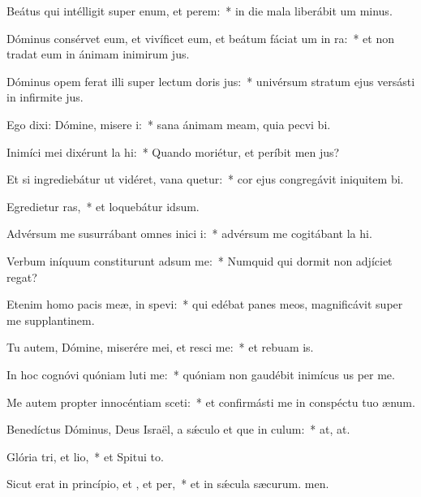 \item Beátus qui intélligit super enum, et perem:~* in die mala liberábit um minus.
\item Dóminus consérvet eum, et vivíficet eum, et beátum fáciat um in ra:~* et non tradat eum in ánimam inimirum jus.
\item Dóminus opem ferat illi super lectum doris jus:~* univérsum stratum ejus versásti in infirmite jus.
\item Ego dixi: Dómine, misere i:~* sana ánimam meam, quia pecvi bi.
\item Inimíci mei dixérunt la hi:~* Quando moriétur, et períbit men jus?
\item Et si ingrediebátur ut vidéret, vana quetur:~* cor ejus congregávit iniquitem bi.
\item Egredietur ras,~* et loquebátur  idsum.
\item Advérsum me susurrábant omnes inici i:~* advérsum me cogitábant la hi.
\item Verbum iníquum constiturunt adsum me:~* Numquid qui dormit non adjíciet  regat?
\item Etenim homo pacis meæ, in  spevi:~* qui edébat panes meos, magnificávit super me supplantinem.
\item Tu autem, Dómine, miserére mei, et resci me:~* et rebuam is.
\item In hoc cognóvi quóniam luti me:~* quóniam non gaudébit inimícus us per me.
\item Me autem propter innocéntiam sceti:~* et confirmásti me in conspéctu tuo  ænum.
\item Benedíctus Dóminus, Deus Israël, a sǽculo et que in culum:~* at, at.
\item Glória tri, et lio,~* et Spitui to.
\item Sicut erat in princípio, et , et per,~* et in sǽcula sæcurum. men.
